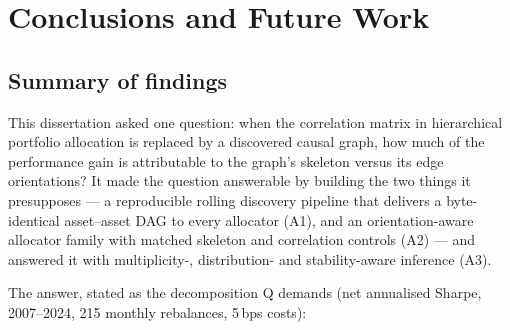 \chapter{Conclusions and Future Work}
\label{chap:conclusion}

\section{Summary of findings}
\label{sec:summary}

This dissertation asked one question: when the correlation matrix in
hierarchical portfolio allocation is replaced by a discovered causal graph,
how much of the performance gain is attributable to the graph's skeleton
versus its edge orientations? It made the question answerable by building the
two things it presupposes --- a reproducible rolling discovery pipeline that
delivers a byte-identical asset--asset DAG to every allocator (A1), and an
orientation-aware allocator family with matched skeleton and correlation
controls (A2) --- and answered it with multiplicity-, distribution- and
stability-aware inference (A3).

The answer, stated as the decomposition Q demands (net annualised Sharpe,
2007--2024, 215 monthly rebalances, 5\,bps costs):

